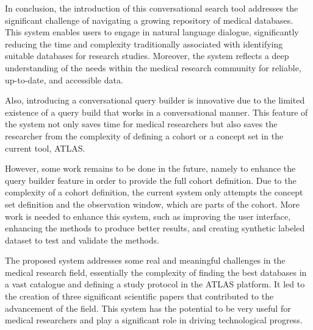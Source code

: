 In conclusion, the introduction of this conversational search tool addresses the significant challenge of navigating a growing repository of medical databases. This system enables users to engage in natural language dialogue, significantly reducing the time and complexity traditionally associated with identifying suitable databases for research studies. Moreover, the system reflects a deep understanding of the needs within the medical research community for reliable, up-to-date, and accessible data.

Also, introducing a conversational query builder is innovative due to the limited existence of a query build that works in a conversational manner. This feature of the system not only saves time for medical researchers but also saves the researcher from the complexity of defining a cohort or a concept set in the current tool, ATLAS.

However, some work remains to be done in the future, namely to enhance the query builder feature in order to provide the full cohort definition. Due to the complexity of a cohort definition, the current system only attempts the concept set definition and the observation window, which are parts of the cohort. More work is needed to enhance this system, such as improving the user interface, enhancing the {\ir} methods to produce better results, and creating synthetic labeled dataset to test and validate the {\ir} methods.

The proposed system addresses some real and meaningful challenges in the medical research field, essentially the complexity of finding the best databases in a vast catalogue and defining a study protocol in the ATLAS platform. It led to the creation of three significant scientific papers that contributed to the advancement of the field. This system has the potential to be very useful for medical researchers and play a significant role in driving technological progress.
